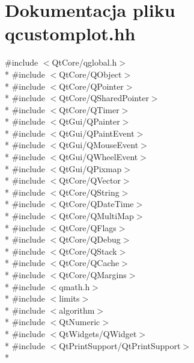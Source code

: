 \hypertarget{qcustomplot_8hh}{}\section{Dokumentacja pliku qcustomplot.\+hh}
\label{qcustomplot_8hh}
{\ttfamily \#include $<$Qt\+Core/qglobal.\+h$>$}\\*
{\ttfamily \#include $<$Qt\+Core/\+Q\+Object$>$}\\*
{\ttfamily \#include $<$Qt\+Core/\+Q\+Pointer$>$}\\*
{\ttfamily \#include $<$Qt\+Core/\+Q\+Shared\+Pointer$>$}\\*
{\ttfamily \#include $<$Qt\+Core/\+Q\+Timer$>$}\\*
{\ttfamily \#include $<$Qt\+Gui/\+Q\+Painter$>$}\\*
{\ttfamily \#include $<$Qt\+Gui/\+Q\+Paint\+Event$>$}\\*
{\ttfamily \#include $<$Qt\+Gui/\+Q\+Mouse\+Event$>$}\\*
{\ttfamily \#include $<$Qt\+Gui/\+Q\+Wheel\+Event$>$}\\*
{\ttfamily \#include $<$Qt\+Gui/\+Q\+Pixmap$>$}\\*
{\ttfamily \#include $<$Qt\+Core/\+Q\+Vector$>$}\\*
{\ttfamily \#include $<$Qt\+Core/\+Q\+String$>$}\\*
{\ttfamily \#include $<$Qt\+Core/\+Q\+Date\+Time$>$}\\*
{\ttfamily \#include $<$Qt\+Core/\+Q\+Multi\+Map$>$}\\*
{\ttfamily \#include $<$Qt\+Core/\+Q\+Flags$>$}\\*
{\ttfamily \#include $<$Qt\+Core/\+Q\+Debug$>$}\\*
{\ttfamily \#include $<$Qt\+Core/\+Q\+Stack$>$}\\*
{\ttfamily \#include $<$Qt\+Core/\+Q\+Cache$>$}\\*
{\ttfamily \#include $<$Qt\+Core/\+Q\+Margins$>$}\\*
{\ttfamily \#include $<$qmath.\+h$>$}\\*
{\ttfamily \#include $<$limits$>$}\\*
{\ttfamily \#include $<$algorithm$>$}\\*
{\ttfamily \#include $<$Qt\+Numeric$>$}\\*
{\ttfamily \#include $<$Qt\+Widgets/\+Q\+Widget$>$}\\*
{\ttfamily \#include $<$Qt\+Print\+Support/\+Qt\+Print\+Support$>$}\\*
